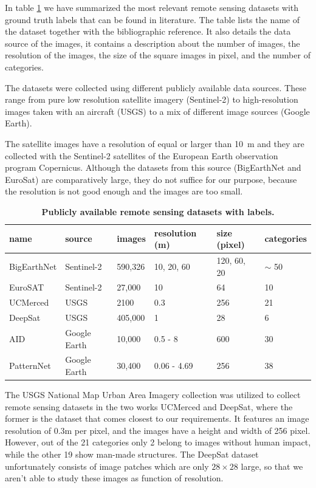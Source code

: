 In table \ref{table:datasets} we have summarized the most relevant remote sensing datasets with ground truth labels that can be found in literature. The table  lists the name of the dataset together with the bibliographic reference. It also details the data source of the images, it contains a description about the number of images, the resolution of the images, the size of the square images in pixel, and the number of categories.

The datasets were collected using different publicly available data sources. These range from pure low resolution satellite imagery (Sentinel-2) to high-resolution images taken with an aircraft (USGS) to a mix of different image sources (Google Earth). 

The satellite images have a resolution of equal or larger than 10~m and they are collected with the Sentinel-2 satellites of the European Earth observation program Copernicus. Although the datasets from this source (BigEarthNet and EuroSat) are comparatively large, they do not suffice for our purpose, because the resolution is not good enough and the images are too small.

\begin{table}[h!]
	\begin{tabular}{l | l | l | l | l | l }
	name & source & images & resolution (m) & size (pixel) & categories \\
	\hline
	BigEarthNet \parencite{sumbul2019} & Sentinel-2 & 590,326 & 10, 20, 60 & 120, 60, 20 & $\sim$ 50 \\
	EuroSAT \parencite{helber2017}	& Sentinel-2 & 27,000  & 10 & 64  & 10 \\
	UCMerced \parencite{yang2010} & USGS & 2100 & 0.3 & 256 & 21 \\
	DeepSat \parencite{basu2015}  & USGS  & 405,000 & 1 & 28 & 6  \\
	AID \parencite{xia2016} & Google Earth & 10,000  & 0.5 - 8  & 600 & 30 \\
	PatternNet \parencite{zhou2017} & Google Earth & 30,400 & 0.06 - 4.69 & 256 & 38 \\
	\end{tabular}
	\caption{\textbf{Publicly available remote sensing datasets with labels.}}
	\label{table:datasets}	
\end{table}

The USGS National Map Urban Area Imagery collection \parencite{usgs} was utilized to collect remote sensing datasets in the two works UCMerced and DeepSat, where the former is the dataset that comes closest to our requirements. It features an image resolution of 0.3m per pixel, and the images have a height and width of 256 pixel. However, out of the 21 categories only 2 belong to images without human impact, while the other 19 show man-made structures. The DeepSat dataset unfortunately consists of image patches which are only $28 \times 28$ large, so that we aren't able to study these images as function of resolution.

